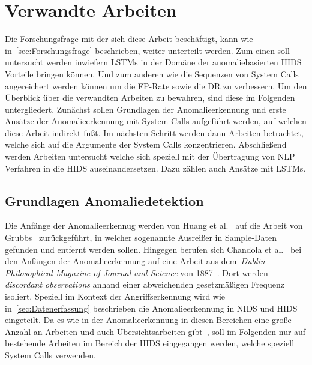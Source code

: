 \chapter{Verwandte Arbeiten}\label{ch:verwandte_arbeiten}

Die Forschungsfrage mit der sich diese Arbeit beschäftigt, kann wie in~\autoref{sec:Forschungsfrage} beschrieben, weiter unterteilt werden.
Zum einen soll untersucht werden inwiefern \acp{LSTM} in der Domäne der anomaliebasierten \ac{HIDS} Vorteile bringen können.
Und zum anderen wie die Sequenzen von System Calls angereichert werden können um die \ac{FP}-Rate sowie die \acf{DR} zu verbessern.
Um den Überblick über die verwandten Arbeiten zu bewahren, sind diese im Folgenden untergliedert.
Zunächst sollen Grundlagen der Anomalieerkennung und erste Ansätze der Anomalieerkennung mit System Calls aufgeführt werden, auf welchen diese Arbeit indirekt fußt.
Im nächsten Schritt werden dann Arbeiten betrachtet, welche sich auf die Argumente der System Calls konzentrieren.
Abschließend werden Arbeiten untersucht welche sich speziell mit der Übertragung von \ac{NLP} Verfahren in die \ac{HIDS} auseinandersetzen.
Dazu zählen auch Ansätze mit \acp{LSTM}.

\section{Grundlagen Anomaliedetektion}

    Die Anfänge der Anomalieerkennug werden von Huang et al.~\cite{ANOMALYBOOKKISHAN2017} auf die Arbeit von Grubbs~\cite{ANOMALYDEFINITION1969} zurückgeführt, in welcher sogenannte Ausreißer in Sample-Daten gefunden und entfernt werden sollen.
    Hingegen berufen sich Chandola et al.~\cite{ANOMALYSURVEY} bei den Anfängen der Anomalieerkennung auf eine Arbeit aus dem~\textit{Dublin Philosophical Magazine of Journal and Science} von 1887~\cite{ANOMALYDEFINITION1887}.
    Dort werden \textit{discordant observations} anhand einer abweichenden gesetzmäßigen Frequenz isoliert. 
    Speziell im Kontext der Angriffserkennung wird wie in~\autoref{sec:Datenerfassung} beschrieben die Anomalieerkennung in \ac{NIDS} und \ac{HIDS} eingeteilt.
    Da es wie in der Anomalieerkennung in diesen Bereichen eine große Anzahl an Arbeiten und auch Übersichtsarbeiten gibt~\cite{ANOMALYSURVEY, ANOMALYSURVEY2, ANOMALYSURVEY3}, soll im Folgenden nur auf bestehende Arbeiten im Bereich der \ac{HIDS} eingegangen werden, welche speziell System Calls verwenden.

